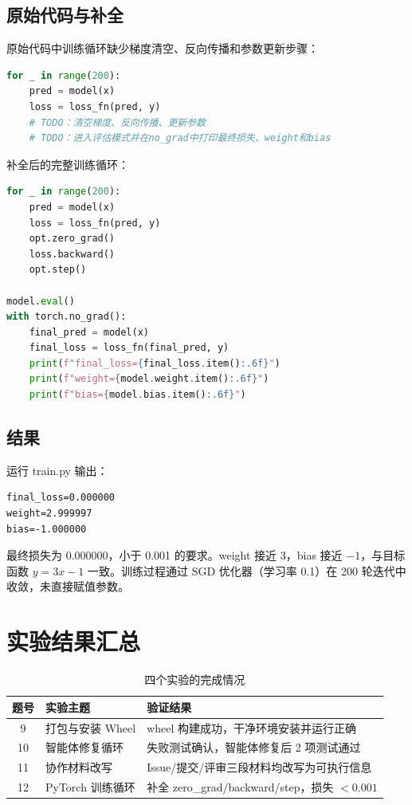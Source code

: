 \documentclass[UTF8]{ctexart}
\begin{document}
\subsection{原始代码与补全}

原始代码中训练循环缺少梯度清空、反向传播和参数更新步骤：

\begin{lstlisting}[language=Python]
for _ in range(200):
    pred = model(x)
    loss = loss_fn(pred, y)
    # TODO：清空梯度、反向传播、更新参数
    # TODO：进入评估模式并在no_grad中打印最终损失、weight和bias
\end{lstlisting}

补全后的完整训练循环：

\begin{lstlisting}[language=Python]
for _ in range(200):
    pred = model(x)
    loss = loss_fn(pred, y)
    opt.zero_grad()
    loss.backward()
    opt.step()

model.eval()
with torch.no_grad():
    final_pred = model(x)
    final_loss = loss_fn(final_pred, y)
    print(f"final_loss={final_loss.item():.6f}")
    print(f"weight={model.weight.item():.6f}")
    print(f"bias={model.bias.item():.6f}")
\end{lstlisting}

\subsection{结果}

运行 train.py 输出：

\begin{lstlisting}
final_loss=0.000000
weight=2.999997
bias=-1.000000
\end{lstlisting}

最终损失为 0.000000，小于 0.001 的要求。weight 接近 3，bias 接近 $-1$，与目标函数 $y = 3x - 1$ 一致。训练过程通过 SGD 优化器（学习率 0.1）在 200 轮迭代中收敛，未直接赋值参数。

\section{实验结果汇总}

\begin{table}[htbp]
\centering
\caption{四个实验的完成情况}
\label{tab:summary}
\begin{tabular}{cll}
\toprule
题号 & 实验主题 & 验证结果 \\
\midrule
9 & 打包与安装 Wheel & wheel 构建成功，干净环境安装并运行正确 \\
10 & 智能体修复循环 & 失败测试确认，智能体修复后 2 项测试通过 \\
11 & 协作材料改写 & Issue/提交/评审三段材料均改写为可执行信息 \\
12 & PyTorch 训练循环 & 补全 zero\_grad/backward/step，损失 $<0.001$ \\
\bottomrule
\end{tabular}
\end{table}
\end{document}
